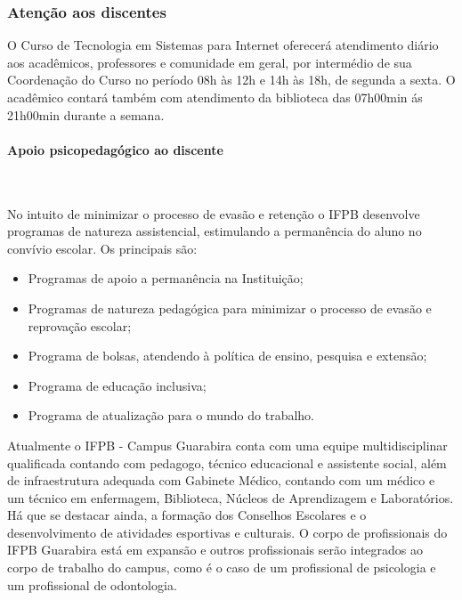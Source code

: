 \subsubsection{Aten\c{c}\~ao aos discentes}

	O Curso de Tecnologia em Sistemas para Internet oferecerá atendimento diário aos acadêmicos, professores e comunidade em geral, por intermédio de sua Coordenação do Curso no período 08h às 12h e 14h às 18h, de segunda a sexta. O acadêmico contará também com atendimento da biblioteca das 07h00min ás 21h00min durante a semana.

\paragraph{Apoio psicopedagógico ao discente}\

       No intuito de minimizar o processo de evasão e retenção o IFPB desenvolve programas de natureza assistencial, estimulando a permanência do aluno no convívio escolar. Os principais são: 


\begin{itemize}
\item Programas de apoio a permanência na Instituição;

\item Programas de natureza pedagógica para minimizar o processo de evasão e reprovação escolar;

\item Programa de bolsas, atendendo à política de ensino, pesquisa e extensão;

\item Programa de educação inclusiva;

\item Programa de atualização para o mundo do trabalho.
\end{itemize}

      Atualmente o IFPB - Campus Guarabira conta com uma equipe multidisciplinar qualificada contando com pedagogo, técnico educacional e assistente social, além de infraestrutura adequada com Gabinete Médico, contando com um m\'edico e um t\'ecnico em enfermagem, Biblioteca, Núcleos de Aprendizagem e Laboratórios. Há que se destacar ainda, a formação dos Conselhos Escolares e o desenvolvimento de atividades esportivas e culturais. O corpo de profissionais do IFPB Guarabira est\'a em expans\~ao e outros profissionais ser\~ao integrados ao corpo de trabalho do campus, como \'e o caso de um profissional de psicologia e um profissional de odontologia.


